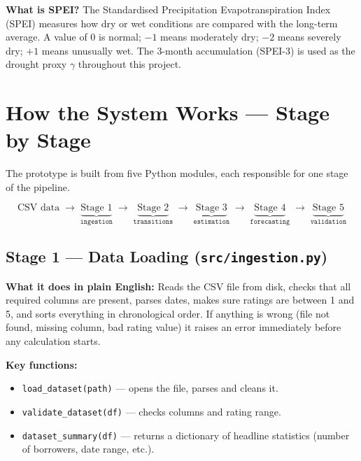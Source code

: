 \documentclass[12pt,a4paper]{article}
\begin{document}
\begin{infobox}
  \textbf{What is SPEI?}  The Standardised Precipitation
  Evapotranspiration Index (SPEI) measures how dry or wet conditions are
  compared with the long-term average.  A value of $0$ is normal; $-1$ means
  moderately dry; $-2$ means severely dry; $+1$ means unusually wet.
  The 3-month accumulation (SPEI-3) is used as the drought proxy $\gamma$
  throughout this project.
\end{infobox}

\newpage
\section{How the System Works --- Stage by Stage}

The prototype is built from five Python modules, each responsible for one
stage of the pipeline.

\[
  \text{CSV data}
  \;\longrightarrow\; \underbrace{\text{Stage 1}}_{\texttt{ingestion}}
  \;\longrightarrow\; \underbrace{\text{Stage 2}}_{\texttt{transitions}}
  \;\longrightarrow\; \underbrace{\text{Stage 3}}_{\texttt{estimation}}
  \;\longrightarrow\; \underbrace{\text{Stage 4}}_{\texttt{forecasting}}
  \;\longrightarrow\; \underbrace{\text{Stage 5}}_{\texttt{validation}}
\]

\subsection{Stage 1 --- Data Loading (\texttt{src/ingestion.py})}

\textbf{What it does in plain English:}
Reads the CSV file from disk, checks that all required columns are present,
parses dates, makes sure ratings are between 1 and 5, and sorts everything in
chronological order.  If anything is wrong (file not found, missing column,
bad rating value) it raises an error immediately before any calculation starts.

\textbf{Key functions:}
\begin{itemize}[leftmargin=1.5em]
  \item \texttt{load\_dataset(path)} --- opens the file, parses and cleans it.
  \item \texttt{validate\_dataset(df)} --- checks columns and rating range.
  \item \texttt{dataset\_summary(df)} --- returns a dictionary of headline
        statistics (number of borrowers, date range, etc.).
\end{itemize}
\end{document}
